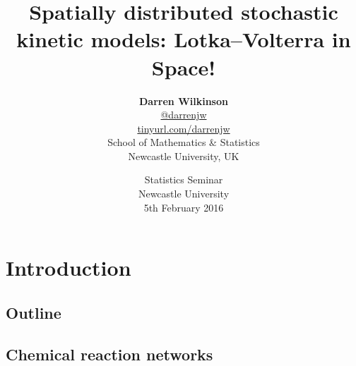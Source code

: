 \documentclass[mathserif]{beamer}
\begin{document}
\title[Spatially distributed stochastic kinetic models]{Spatially distributed stochastic kinetic models: Lotka--Volterra in Space!}
\author[Darren Wilkinson --- Statistics seminar, 5/2/16]{\textbf{\large Darren Wilkinson} \\
\url{@darrenjw}\\
\alert{\url{tinyurl.com/darrenjw}}\\
School of Mathematics \& Statistics\\Newcastle University, UK}
\date{Statistics Seminar\\Newcastle University\\5th February 2016}

\frame{\titlepage}

\section{Introduction}

\subsection{Outline}


\subsection{Chemical reaction networks}
\end{document}
